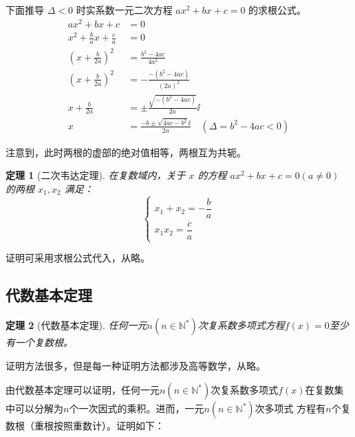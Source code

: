 \documentclass[a4paper,openany]{ctexbook}
\newtheorem{thmlevel1}{定理}
\begin{document}
下面推导 \(\varDelta<0\) 时实系数一元二次方程 \(ax^2+bx+c=0\) 的求根公式。
\begin{align*}
    ax^2+bx+c                     & =0                                                             \\
    x^2+\frac{b}{a}x+\frac{c}{a}  & =0                                                             \\
    \left(x+\frac{b}{2a}\right)^2 & =\frac{b^2-4ac}{4a^2}                                          \\
    \left(x+\frac{b}{2a}\right)^2 & =-\frac{-(b^2-4ac)}{(2a)^2}                                    \\
    x+\frac{b}{2a}                & =\pm\frac{\sqrt{-(b^2-4ac)}}{2a}\ii                            \\
    x                             & =\frac{-b\pm\sqrt{4ac-b^2}\ii}{2a} \quad (\varDelta=b^2-4ac<0)
\end{align*}

注意到，此时两根的虚部的绝对值相等，两根互为共轭。

\begin{thmlevel1}[二次韦达定理]\label{thm:erciwwdadkli}
    在复数域内，关于 \(x\) 的方程 \(ax^2+bx+c=0(a\ne 0)\) 的两根 \(x_1,x_2\) 满足：
    \[
        \begin{cases}
            x_1+x_2=-\dfrac{b}{a} \\
            x_1x_2=\dfrac{c}{a}
        \end{cases}
    \]
\end{thmlevel1}

证明可采用求根公式代入，从略。

\subsection{代数基本定理}

\begin{thmlevel1}[代数基本定理]
    任何一元\(n(n\in \mathbb{N^*})\)次复系数多项式方程\(f(x)=0\)至少有一个复数根。
\end{thmlevel1}

证明方法很多，但是每一种证明方法都涉及高等数学，从略。

由代数基本定理可以证明，任何一元\(n(n\in \mathbb{N^*})\)次复系数多项式\(f(x)\)在复数集中可以分解为\(n\)个一次因式的乘积。进而，一元\(n(n\in \mathbb{N^*})\)次多项式
方程有\(n\)个复数根（重根按照重数计）。证明如下：
\end{document}
